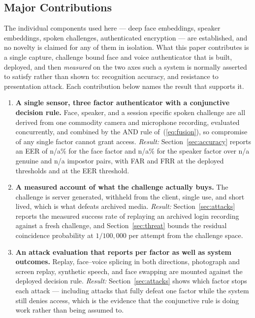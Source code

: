 \documentclass[runningheads]{llncs}
\providecommand{\EvalGenuinePairs}{n/a}
\providecommand{\EvalImpostorPairs}{n/a}
\providecommand{\EvalFaceEER}{n/a}
\providecommand{\EvalVoiceEER}{n/a}
\providecommand{\AttackChallengeSpace}{100{,}000}
\begin{document}
{\color{black}
\subsection{Major Contributions}\label{sec:contrib}
The individual components used here --- deep face embeddings, speaker embeddings, spoken challenges, authenticated encryption --- are established, and no novelty is claimed for any of them in isolation. What this paper contributes is a single capture, challenge bound face and voice authenticator that is built, deployed, and then \emph{measured} on the two axes such a system is normally asserted to satisfy rather than shown to: recognition accuracy, and resistance to presentation attack. Each contribution below names the result that supports it.

\begin{enumerate}[leftmargin=*,itemsep=2pt,topsep=3pt]
\item \textbf{A single sensor, three factor authenticator with a conjunctive decision rule.} Face, speaker, and a session specific spoken challenge are all derived from one commodity camera and microphone recording, evaluated concurrently, and combined by the AND rule of~(\ref{eq:fusion}), so compromise of any single factor cannot grant access. \emph{Result:} Section~\ref{sec:accuracy} reports an EER of \EvalFaceEER\% for the face factor and \EvalVoiceEER\% for the speaker factor over \EvalGenuinePairs{} genuine and \EvalImpostorPairs{} impostor pairs, with FAR and FRR at the deployed thresholds and at the EER threshold.

\item \textbf{A measured account of what the challenge actually buys.} The challenge is server generated, withheld from the client, single use, and short lived, which is what defeats archived media. \emph{Result:} Section~\ref{sec:attacks} reports the measured success rate of replaying an archived login recording against a fresh challenge, and Section~\ref{sec:threat} bounds the residual coincidence probability at $1/\AttackChallengeSpace$ per attempt from the challenge space.

\item \textbf{An attack evaluation that reports per factor as well as system outcomes.} Replay, face--voice splicing in both directions, photograph and screen replay, synthetic speech, and face swapping are mounted against the deployed decision rule. \emph{Result:} Section~\ref{sec:attacks} shows which factor stops each attack --- including attacks that fully defeat one factor while the system still denies access, which is the evidence that the conjunctive rule is doing work rather than being assumed to.


\end{enumerate}}
\end{document}
